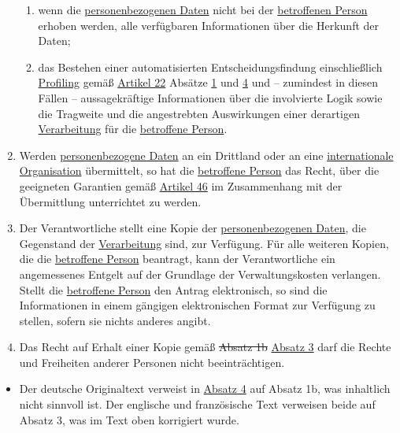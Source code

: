 \begin{enumerate}
\begin{enumerate}
    \item wenn die \hyperref[itm:04-1]{personenbezogenen Daten} nicht bei der \hyperref[itm:04-1]{betroffenen Person} erhoben werden, alle verfügbaren
     Informationen über die Herkunft der Daten;
    \label{itm:15-1g}

    \item das Bestehen einer automatisierten Entscheidungsfindung einschließlich \hyperref[itm:04-4]{Profiling} gemäß \hyperref[ch:22]
     {Artikel 22} Absätze \hyperref[itm:22-1]{1} und \hyperref[itm:22-4]{4} und -- zumindest in diesen Fällen --
     aussagekräftige Informationen über die involvierte Logik sowie die Tragweite und die angestrebten Auswirkungen
     einer derartigen \hyperref[itm:04-2]{Verarbeitung} für die \hyperref[itm:04-1]{betroffene Person}.
    \label{itm:15-1h}

  \end{enumerate}

  \item Werden \hyperref[itm:04-1]{personenbezogene Daten} an ein Drittland oder an eine \hyperref[itm:04-29]{internationale Organisation} übermittelt, so hat die
   \hyperref[itm:04-1]{betroffene Person} das Recht, über die geeigneten Garantien gemäß \hyperref[ch:46]{Artikel 46} im Zusammenhang mit der
   Übermittlung unterrichtet zu werden.
  \label{itm:15-2}

  \item Der Verantwortliche stellt eine Kopie der \hyperref[itm:04-1]{personenbezogenen Daten}, die Gegenstand der \hyperref[itm:04-2]{Verarbeitung} sind, zur
   Verfügung. Für alle weiteren Kopien, die die \hyperref[itm:04-1]{betroffene Person} beantragt, kann der Verantwortliche ein angemessenes
   Entgelt auf der Grundlage der Verwaltungskosten verlangen. Stellt die \hyperref[itm:04-1]{betroffene Person} den Antrag elektronisch, so
   sind die Informationen in einem gängigen elektronischen Format zur Verfügung zu stellen, sofern sie nichts anderes
   angibt.
  \label{itm:15-3}

  \item Das Recht auf Erhalt einer Kopie gemäß \sout{Absatz 1b} \hyperref[itm:15-3]{Absatz 3} darf die Rechte und
   Freiheiten anderer Personen nicht beeinträchtigen.
  \label{itm:15-4}

\end{enumerate}


\begin{itemize}

  \item Der deutsche Originaltext verweist in \hyperref[itm:15-4]{Absatz 4} auf Absatz 1b, was inhaltlich nicht sinnvoll
   ist. Der englische und französische Text verweisen beide auf Absatz 3, was im Text oben korrigiert wurde.

\end{itemize}

